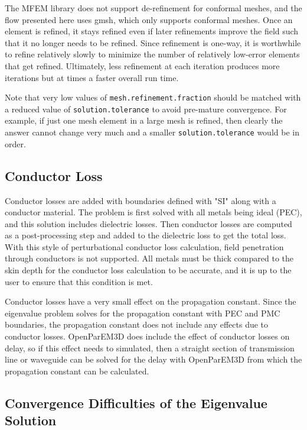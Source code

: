 \documentclass[titlepage]{article}
\renewcommand\_{\textunderscore\linebreak[1]}
\begin{document}
The MFEM library does not support de-refinement for conformal meshes, and the flow presented here uses gmsh, which only supports conformal meshes. Once an element is refined, it stays refined even if later refinements improve the field such that it no longer needs to be refined.  Since refinement is one-way, it is worthwhile to refine relatively slowly to minimize the number of relatively low-error elements that get refined.  Ultimately, less refinement at each iteration produces more iterations but at times a faster overall run time.

Note that very low values of \texttt{mesh.refinement.fraction} should be matched with a reduced value of \texttt{solution.tolerance} to avoid pre-mature convergence.  For example, if just one mesh element in a large mesh is refined, then clearly the answer cannot change very much and a smaller \texttt{solution.tolerance} would be in order.

\subsection{Conductor Loss}

Conductor losses are added with boundaries defined with "SI" along with a conductor material. The problem is first solved with all metals being ideal (PEC), and this solution includes dielectric losses.  Then conductor losses are computed as a post-processing step and added to the dielectric loss to get the total loss.  With this style of perturbational conductor loss calculation, field penetration through conductors is not supported.  All metals must be thick compared to the skin depth for the conductor loss calculation to be accurate, and it is up to the user to ensure that this condition is met.

Conductor losses have a very small effect on the propagation constant.  Since the eigenvalue problem solves for the propagation constant with PEC and PMC boundaries, the propagation constant does not include any effects due to conductor losses.  OpenParEM3D does include the effect of conductor losses on delay, so if this effect needs to simulated, then a straight section of transmission line or waveguide can be solved for the delay with OpenParEM3D from which the propagation constant can be calculated.

\subsection{Convergence Difficulties of the Eigenvalue Solution}
\end{document}
